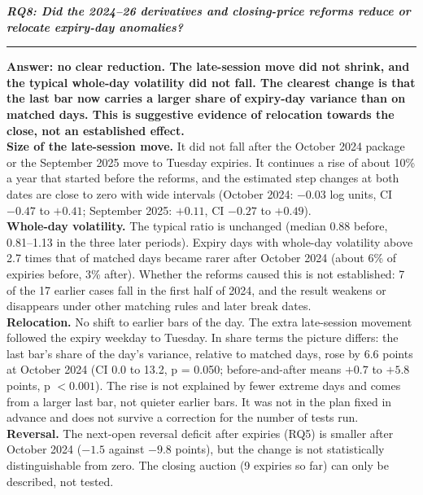 \documentclass[10pt,a4paper]{article}
\begin{document}
{\raggedright\Large\bfseries\itshape RQ8: Did the 2024--26 derivatives and closing-price reforms reduce or relocate expiry-day anomalies?\par}
\vspace{2pt}\hrule\vspace{6pt}

\textbf{Answer: no clear reduction. The late-session move did not shrink, and the typical whole-day volatility did not fall. The clearest change is that the last bar now carries a larger share of expiry-day variance than on matched days. This is suggestive evidence of relocation towards the close, not an established effect.}\\
\textbf{Size of the late-session move.} It did not fall after the October 2024 package or the September 2025 move to Tuesday expiries. It continues a rise of about 10\% a year that started before the reforms, and the estimated step changes at both dates are close to zero with wide intervals (October 2024: $-0.03$ log units, CI $-0.47$ to $+0.41$; September 2025: $+0.11$, CI $-0.27$ to $+0.49$).\\
\textbf{Whole-day volatility.} The typical ratio is unchanged (median 0.88 before, 0.81--1.13 in the three later periods). Expiry days with whole-day volatility above 2.7 times that of matched days became rarer after October 2024 (about 6\% of expiries before, 3\% after). Whether the reforms caused this is not established: 7 of the 17 earlier cases fall in the first half of 2024, and the result weakens or disappears under other matching rules and later break dates.\\
\textbf{Relocation.} No shift to earlier bars of the day. The extra late-session movement followed the expiry weekday to Tuesday. In share terms the picture differs: the last bar's share of the day's variance, relative to matched days, rose by 6.6 points at October 2024 (CI 0.0 to 13.2, p = 0.050; before-and-after means $+0.7$ to $+5.8$ points, p $<0.001$). The rise is not explained by fewer extreme days and comes from a larger last bar, not quieter earlier bars. It was not in the plan fixed in advance and does not survive a correction for the number of tests run.\\
\textbf{Reversal.} The next-open reversal deficit after expiries (RQ5) is smaller after October 2024 ($-1.5$ against $-9.8$ points), but the change is not statistically distinguishable from zero. The closing auction (9 expiries so far) can only be described, not tested.
\end{document}
